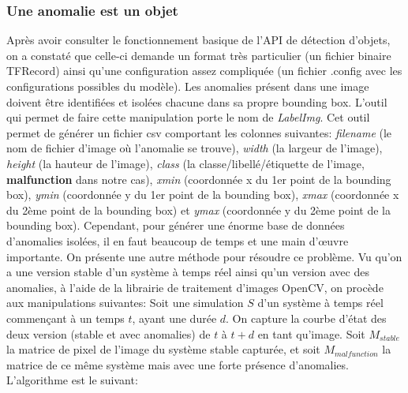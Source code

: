 \documentclass[french]{article}
\theoremstyle{mytheoremstyle}
\theoremstyle{mytheoremstyle}
\theoremstyle{myproblemstyle}
\begin{document}
        \subsubsection{Une anomalie est un objet}
        Après avoir consulter le fonctionnement basique de l'API de détection d'objets, on a constaté que celle-ci demande un format très particulier (un fichier binaire TFRecord) ainsi qu'une configuration assez compliquée (un fichier .config avec les configurations possibles du modèle). Les anomalies présent dans une image doivent être identifiées et isolées chacune dans sa propre bounding box. L'outil qui permet de faire cette manipulation porte le nom de \textit{LabelImg}. Cet outil permet de générer un fichier csv comportant les colonnes suivantes: \textit{filename} (le nom de fichier d'image où l'anomalie se trouve), \textit{width} (la largeur de l'image), \textit{height} (la hauteur de l'image), \textit{class} (la classe/libellé/étiquette de l'image, \textbf{malfunction} dans notre cas), \textit{xmin} (coordonnée x du 1er point de la bounding box), \textit{ymin} (coordonnée y du 1er point de la bounding box), \textit{xmax} (coordonnée x du 2ème point de la bounding box) et \textit{ymax} (coordonnée y du 2ème point de la bounding box). Cependant, pour générer une énorme base de données d'anomalies isolées, il en faut beaucoup de temps et une main d'œuvre importante. On présente une autre méthode pour résoudre ce problème.
        \newline
        \indent Vu qu'on a une version stable d'un système à temps réel ainsi qu'un version avec des anomalies, à l'aide de la librairie de traitement d'images OpenCV, on procède aux manipulations suivantes:
        \newline
        Soit une simulation $S$ d'un système à temps réel commençant à un temps $t$, ayant une durée $d$. On capture la courbe d'état des deux version (stable et avec anomalies) de $t$ à $t+d$ en tant qu'image.
        \newline
        Soit $M_{stable}$ la matrice de pixel de l'image du système stable capturée, et soit $M_{malfunction}$ la matrice de ce même système mais avec une forte présence d'anomalies.
        L'algorithme est le suivant:
\end{document}
